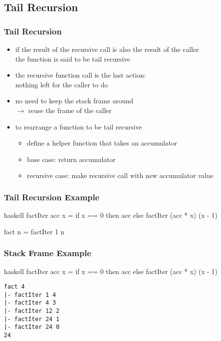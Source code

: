 \documentclass[dvipsnames]{beamer}
\theoremstyle{plain}
\begin{document}
\subsection{Tail Recursion}

\begin{frame}
  \frametitle{Tail Recursion}

  \begin{itemize}
    \item if the result of the recursive call is also the result of the caller\\
      the function is said to be \alert{tail recursive}
    \item the recursive function call is the last action:\\
      nothing left for the caller to do

    \pause
    \medskip
    \item no need to keep the stack frame around\\
      $\rightarrow$ reuse the frame of the caller

    \pause
    \medskip
    \item to rearrange a function to be tail recursive
    \begin{itemize}
      \item define a helper function that takes an \alert{accumulator}
      \item base case: return accumulator
      \item recursive case: make recursive call with new accumulator value
    \end{itemize}
  \end{itemize}
\end{frame}

\begin{frame}[fragile]
  \frametitle{Tail Recursion Example}

  \begin{example}[factorial]
    \begin{pygments}{haskell}
factIter acc x =
    if x == 0
    then acc
    else factIter (acc * x) (x - 1)

fact n = factIter 1 n
    \end{pygments}
  \end{example}
\end{frame}

\begin{frame}[fragile]
  \frametitle{Stack Frame Example}

  \begin{example}
    \begin{pygments}{haskell}
factIter acc x =
    if x == 0 then acc
    else factIter (acc * x) (x - 1)
    \end{pygments}

    \pause
    \begin{verbatim}
fact 4
|- factIter 1 4
|- factIter 4 3
|- factIter 12 2
|- factIter 24 1
|- factIter 24 0
24
    \end{verbatim}
  \end{example}
\end{frame}
\end{document}
